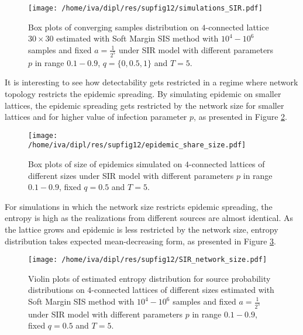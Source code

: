 \documentclass[times, utf8, diplomski]{fer}
\begin{document}
\begin{figure}[H]
\begin{minipage}{\textwidth}
\center
\texttt{[image: /home/iva/dipl/res/supfig12/simulations\_SIR.pdf]}
\caption{Box plots of converging samples distribution on  $4$-connected lattice $30 \times 30$ estimated with Soft Margin SIS method with $10^4 - 10^6$ samples and fixed $a=\frac{1}{2^5}$ under SIR  model with different parameters $p$ in range $0.1 - 0.9$,  $q = \{0, 0.5, 1\}$ and $T = 5$.}
\label{simulations_SIR}
\end{minipage}
\end{figure}

It is interesting to see how  detectability gets restricted in a regime where network topology restricts the epidemic spreading. By simulating epidemic on smaller lattices, the epidemic spreading gets restricted by the network size for smaller lattices and for higher value of infection parameter $p$, as presented in Figure \ref{epidemic_size}. 

\begin{figure}
\begin{minipage}{\textwidth}
\center
\texttt{[image: /home/iva/dipl/res/supfig12/epidemic\_share\_size.pdf]}
\caption{Box plots of size of epidemics simulated on  $4$-connected lattices of different sizes under SIR model with different parameters $p$ in range $0.1 - 0.9$, fixed $q = 0.5$ and $T = 5$.}
\label{epidemic_size}
\end{minipage}
\end{figure}

For simulations in which the network size restricts epidemic spreading, the entropy is high as the realizations from different sources are almost identical. As the lattice grows and epidemic is less restricted by the network size, entropy distribution takes expected mean-decreasing form, as presented in Figure \ref{network_size}.

\begin{figure}
\center
\texttt{[image: /home/iva/dipl/res/supfig12/SIR\_network\_size.pdf]}
\caption{Violin plots of estimated entropy distribution for source probability distributions  on  $4$-connected lattices of different sizes estimated with Soft Margin SIS method with $10^4 - 10^6$ samples and fixed $a=\frac{1}{2^5}$ under SIR model with different parameters $p$ in range $0.1 - 0.9$, fixed $q = 0.5$ and $T = 5$.}
\label{network_size}
\end{figure}
\end{document}
